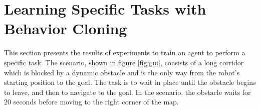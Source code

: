 \section{Learning Specific Tasks with Behavior Cloning}
This section presents the results of experiments to train an agent to perform a specific task. The scenario, shown in figure \ref{fig:gui}, consists of a long corridor which is blocked by a dynamic obstacle and is the only way from the robot’s starting position to the goal. The task is to wait in place until the obstacle begins to leave, and then to navigate to the goal. In the scenario, the obstacle waits for 20 seconds before moving to the right corner of the map.

